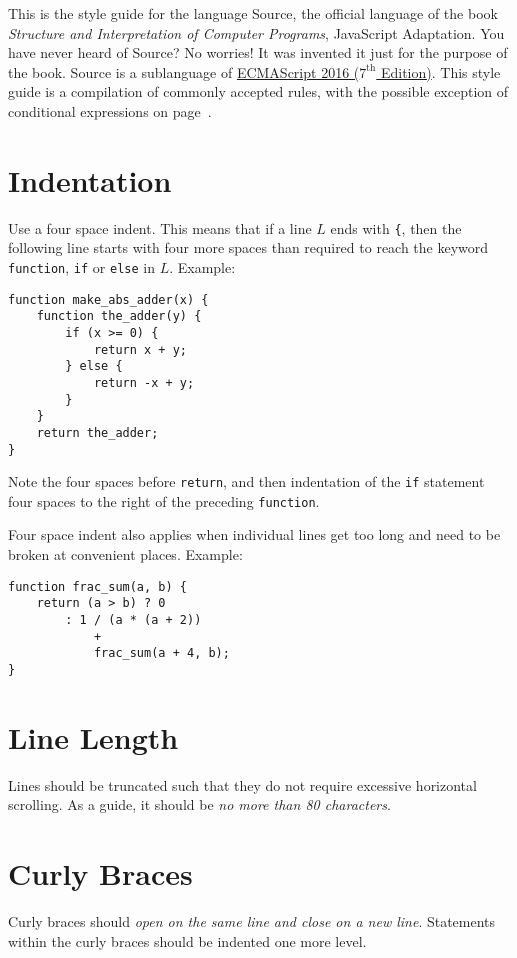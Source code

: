 



This is the style guide for the language Source,
the official language of the book \emph{Structure and Interpretation
of Computer Programs}, JavaScript Adaptation.
You have never heard of Source? No worries! It was invented
it just for the purpose of the book. Source is a sublanguage of 
\href{http://www.ecma-international.org/publications/files/ECMA-ST/Ecma-262.pdf}{
ECMAScript 2016 ($7^{\textrm{th}}$ Edition)}. This style guide is a compilation
of commonly accepted rules, with the possible exception of conditional expressions
on page~\pageref{condex}.
        
\section*{Indentation}
  Use a four space indent. This means that if a line $L$ ends with \verb#{#, then 
the following line starts with four more spaces than required to reach the keyword
\lstinline{function}, \lstinline{if} or \lstinline{else} in $L$.
Example:
\begin{lstlisting}
function make_abs_adder(x) {
    function the_adder(y) {
        if (x >= 0) {
            return x + y;
        } else {
            return -x + y;
        }
    }
    return the_adder;
}
\end{lstlisting}
Note the four spaces before \lstinline{return}, and then indentation of the \lstinline{if}
statement four spaces to the right of the preceding \lstinline{function}.

Four space indent also applies when individual lines get too long and
need to be broken at convenient places. Example:
\begin{lstlisting}
function frac_sum(a, b) {
    return (a > b) ? 0
        : 1 / (a * (a + 2))
            +
            frac_sum(a + 4, b);
}
\end{lstlisting}

\section*{Line Length}
  Lines should be truncated such that they do not require excessive horizontal scrolling.
  As a guide, it should be \emph{no more than 80 characters}.
  
\section*{Curly Braces}
  Curly braces should \emph{open on the same line and close on a new line}.
  Statements within the curly braces should be indented one more level.

